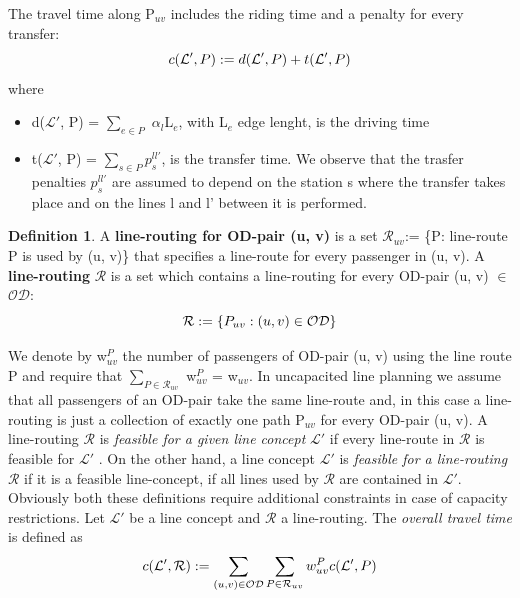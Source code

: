 \documentclass[
  twoside,
  11pt, a4paper,
  footinclude=true,
  headinclude=true,
  cleardoublepage=empty
]{scrbook}
\theoremstyle{definition}
\newtheorem{definition}[theorem]{Definition}
\begin{document}
The travel time along P$_{uv}$ includes the riding time and a penalty for every transfer:
\begin{equation} \notag
c(\mathcal{L'}, P) := d(\mathcal{L'}, P) + t(\mathcal{L'}, P)
\end{equation}
where
\begin{itemize}
\item d($\mathcal{L'}$, P) = $\sum_{e \in P}$ $\alpha_l$L$_e$, with L$_e$ edge lenght, is the driving time
\item t($\mathcal{L'}$, P) =  $\sum_{s \in P} p^{ll'}_s$, is the transfer time. We observe that the trasfer penalties $p^{ll'}_s$ are assumed to depend on the station s where the transfer takes place and on the lines l and l' between it is performed.
\end{itemize}
\begin{definition} A \textbf{line-routing for OD-pair (u, v)} is a set $\mathcal{R}_{uv}$:= \{P: line-route P is used by (u, v)\} that specifies a line-route for every passenger in (u, v). \newline
A \textbf{line-routing} $\mathcal{R}$ is a set which contains a line-routing for every OD-pair (u, v) $\in$ $\mathcal{OD}$:
\begin{equation} \notag
\mathcal{R} := \{P_{uv} : (u, v) \in \mathcal{OD}\}
\end{equation}
\end{definition}
We denote by w$^P_{uv}$ the number of passengers of OD-pair (u, v) using the line route P and require that $\sum_{P \in \mathcal{R}_{uv}}$ w$^P_{uv}$ = w$_{uv}$. In uncapacited line planning we assume that all passengers of an OD-pair take the same line-route and, in this case a line-routing is just a collection of exactly one path P$_{uv}$ for every OD-pair (u, v). \newline
A line-routing $\mathcal{R}$ is \emph{feasible for a given line concept} $\mathcal{L'}$ if every line-route in $\mathcal{R}$ is feasible for $\mathcal{L'}$ . \newline
On the other hand, a line concept $\mathcal{L'}$ is \emph{feasible for a line-routing} $\mathcal{R}$ if it is a feasible line-concept, if all lines used by $\mathcal{R}$ are contained in $\mathcal{L'}$. \newline
Obviously both these definitions require additional constraints in case of capacity restrictions. \newline
Let $\mathcal{L'}$ be a line concept and $\mathcal{R}$ a line-routing. The \emph{overall travel time} is defined as
\begin{equation} \notag
c(\mathcal{L'}, \mathcal{R}) := \sum_{(u, v) \in \mathcal{OD}} \sum_{P \in \mathcal{R}_{uv}} w^P_{uv}c(\mathcal{L'}, P)
\end{equation} 
\end{document}
